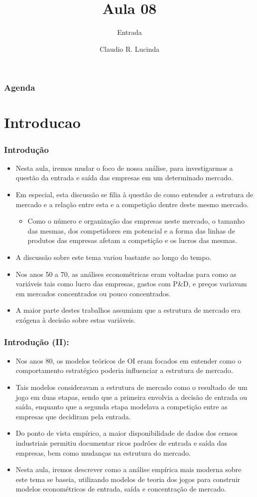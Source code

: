 \documentclass{beamer}
\title{Aula 08}
\subtitle{Entrada}
\author{Claudio R. Lucinda}
\institute{FEA-RP/USP}
\date{}
\begin{document}
\frame{\titlepage}
\begin{frame}\frametitle{Agenda}
  \tableofcontents[pausesections]
\end{frame}
\section{Introducao}
\begin{frame}\frametitle{Introdução}
\small
\begin{itemize}
\item Nesta aula, iremos mudar o foco de nossa análise, para investigarmos
a questão da entrada e saída das empresas em um determinado mercado. 
\item Em especial, esta discussão se filia à questão de como entender a
estrutura de mercado e a relação entre esta e a competição dentre
deste mesmo mercado. 

\begin{itemize}
\item Como o número e organização das empresas neste mercado, o tamanho
das mesmas, dos competidores em potencial e a forma das linhas de
produtos das empresas afetam a competição e os lucros das mesmas. 
\end{itemize}
\item A discussão sobre este tema variou bastante ao longo do tempo. 
\item Nos anos 50 a 70, as análises econométricas eram voltadas para como
as variáveis tais como lucro das empresas, gastos com P\&D, e preços
variavam em mercados concentrados ou pouco concentrados. 
\item A maior parte destes trabalhos assumiam que a estrutura de mercado
era exógena à decisão sobre estas variáveis. 
\end{itemize}
\end{frame}

\begin{frame}\frametitle{Introdução (II):}
\small
\begin{itemize}
\item Nos anos 80, os modelos teóricos de OI eram focados em entender como
o comportamento estratégico poderia influenciar a estrutura de mercado. 
\item Tais modelos consideravam a estrutura de mercado como o resultado
de um jogo em duas etapas, sendo que a primeira envolvia a decisão
de entrada ou saída, enquanto que a segunda etapa modelava a competição
entre as empresas que decidiram pela entrada. 
\item Do ponto de vista empírico, a maior disponibilidade de dados dos censos
industriais permitiu documentar ricos padrões de entrada e saída das
empresas, bem como mudanças na estrutura do mercado. 
\item Nesta aula, iremos descrever como a análise empírica mais moderna
sobre este tema se baseia, utilizando modelos de teoria dos jogos
para construir modelos econométricos de entrada, saída e concentração
de mercado. 
\end{itemize}
\end{frame}
\end{document}
